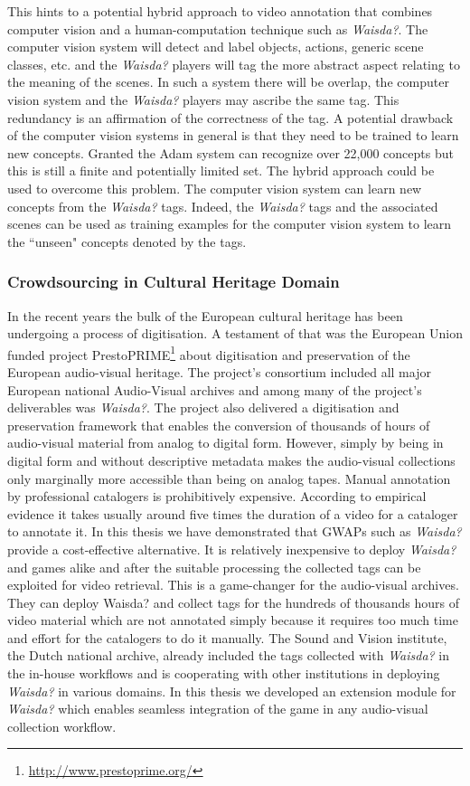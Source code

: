 This hints to a potential hybrid approach to video annotation that combines computer vision and a human-computation technique such as \textit{Waisda?}. The computer vision system will detect and label objects, actions, generic scene classes, etc. and the \textit{Waisda?} players will tag the more abstract aspect relating to the meaning of the scenes. In such a system there will be overlap, the computer vision system and the \textit{Waisda?} players may ascribe the same tag. This redundancy is an affirmation of the correctness of the tag. A potential drawback of the computer vision systems in general is that they need to be trained to learn new concepts. Granted the Adam system can recognize over 22,000 concepts but this is still a finite and potentially limited set. The hybrid approach could be used to overcome this problem. The computer vision system can learn new concepts from the \textit{Waisda?} tags. Indeed, the \textit{Waisda?} tags and the associated scenes can be used as training examples for the computer vision system to learn the ``unseen" concepts denoted by the tags.

\subsubsection{Crowdsourcing in Cultural Heritage Domain}
In the recent years the bulk of the European cultural heritage has been undergoing a process of digitisation. A testament of that was the European Union funded project PrestoPRIME\footnote{\url{http://www.prestoprime.org/}} about digitisation and preservation of the European audio-visual heritage. The project's consortium included all major European national Audio-Visual archives and among many of the project's deliverables was \textit{Waisda?}. The project also delivered a digitisation and preservation framework that enables the conversion of thousands of hours of audio-visual material from analog to digital form. However, simply by being in digital form and without descriptive metadata makes the audio-visual collections only marginally more accessible than being on analog tapes. Manual annotation by professional catalogers is prohibitively expensive. According to empirical evidence it takes usually around five times the duration of a video for a cataloger to annotate it. In this thesis we have demonstrated that GWAPs such as \textit{Waisda?} provide a cost-effective alternative. It is relatively inexpensive to deploy \textit{Waisda?} and games alike and after the suitable processing the collected tags can be exploited for video retrieval. This is a game-changer for the audio-visual archives. They can deploy Waisda? and collect tags for the hundreds of thousands hours of video material which are not annotated simply because it requires too much time and effort for the catalogers to do it manually. The Sound and Vision institute, the Dutch national archive, already included the tags collected with \textit{Waisda?} in the in-house workflows and is cooperating with other institutions in deploying \textit{Waisda?} in various domains. In this thesis we developed an extension module for \textit{Waisda?} which enables seamless integration of the game in any audio-visual collection workflow.

